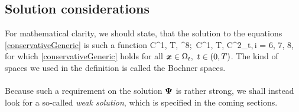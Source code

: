 \subsection{Solution considerations}
For mathematical clarity, we should state, that the solution to the equations \cref{conservativeGeneric} is such a function
\be
\label{HardSln} \mrPsi\in C^1\lo{}, T\ro, ^8\ro;\ \mrPsii\in C^1\lo{}, T\ro, C^2\lo\Omega_{t}\ro\ro,\,i = 6, 7, 8,
\ee
for which \cref{conservativeGeneric} holds for all $\mbox{\boldmath $x$}\in\Omega_t,\ t\in\left( 0, T\right)$. The kind of spaces we used in the definition is called the Bochner spaces.
\paragraph{}
Because such a requirement on the solution $\mathrm{\mathbf{\Psi}}$ is rather strong, we shall instead look for a so-called \textit{weak solution}, which is specified in the coming sections.